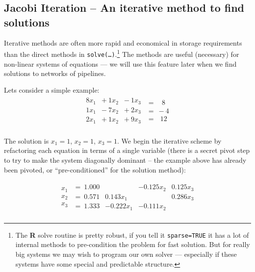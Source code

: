 \subsection{Jacobi Iteration -- An iterative method to find solutions}
Iterative methods are often more rapid and economical in storage requirements than the direct methods in \texttt{solve(\dots)}.\footnote{The \textbf{R} solve routine is pretty robust, if you tell it \texttt{sparse=TRUE} it has a lot of internal methods to pre-condition the problem for fast solution.  But for really big systems we may wish to program our own solver --- especially if these systems have some special and predictable structure.}  The methods are useful (necessary) for non-linear systems of equations --- we will use this feature later when we find solutions to networks of pipelines.  

Lets consider a simple example:
\begin{gather}
\begin{matrix}
8 x_1 & +~1 x_2 & -~1 x_3  \\
1 x_1 & -~7 x_2 &  +~2 x_3 \\
2 x_1 & +~1 x_2 & +~9 x_3  \\
\end{matrix}
\begin{matrix}
=~~~~8\\
=~-4\\
=~~~12\\
\end{matrix}
\end{gather}

The solution is $x_1 = 1$, $x_2 = 1$, $x_3 = 1$.  
We begin the iterative scheme by refactoring each equation in terms of a single variable (there is a secret pivot step to try to make the system diagonally dominant -- the example above has already been pivoted, or ``pre-conditioned'' for the solution method):

\begin{gather}
\begin{matrix}
x_1 \\
x_2 \\
x_3  \\
\end{matrix}
\begin{matrix}
=~ 1.000 & ~ & -0.125 x_2 & 0.125 x_3 \\
=~ 0.571 & 0.143 x_1  & ~ & 0.286 x_3 \\
=~ 1.333 & -0.222 x_1 & -0.111 x_2 & ~ \\
\end{matrix}
\end{gather}

